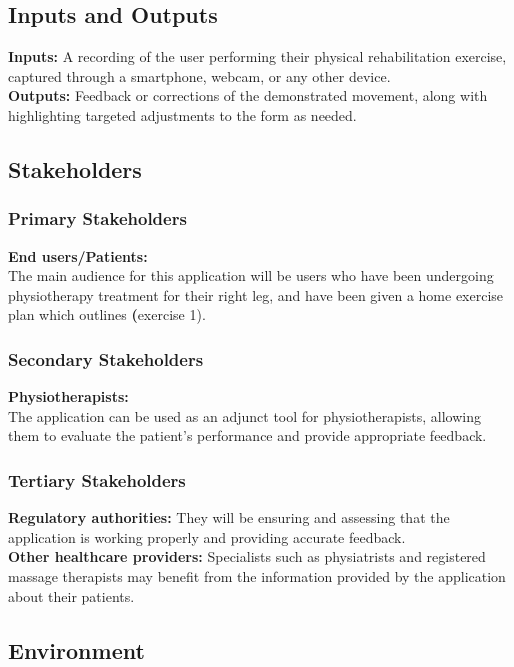 \documentclass{article}
\begin{document}
\subsection{Inputs and Outputs}

\textbf{Inputs:} A recording of the user performing their physical rehabilitation exercise, captured through a smartphone, webcam, or any other device. \\
\textbf{Outputs:} Feedback or corrections of the demonstrated movement, along with highlighting targeted adjustments to the form as needed. 

\subsection{Stakeholders}
  \subsubsection{Primary Stakeholders}
    \textbf{End users/Patients:} \\
      The main audience for this application will be users who have been undergoing physiotherapy treatment for their right leg, and have been given a home exercise plan which outlines \textbf(exercise 1). \\    
     
  \subsubsection{Secondary Stakeholders}
    \textbf{Physiotherapists:} \\
      The application can be used as an adjunct tool for physiotherapists, allowing them to evaluate the patient's performance and provide appropriate feedback. 
      
  \subsubsection{Tertiary Stakeholders}
    \textbf{Regulatory authorities:}
      They will be ensuring and assessing that the application is working properly and providing accurate feedback. \\
     \textbf{Other healthcare providers:}
       Specialists such as physiatrists and registered massage therapists may benefit from the information provided by the application about their patients. 

\subsection{Environment}
\end{document}
